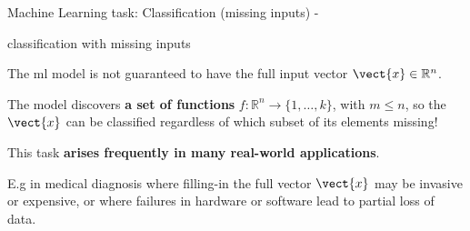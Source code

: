 
\begin{frame}[t,allowframebreaks]{
    Machine Learning task: Classification (missing inputs) - }

    \Gls{classification} with missing inputs
    
    \begin{itemize}
        {
            \item The \gls{ml} model is not guaranteed 
            to have the full input vector $\vect{x} \in \mathbb{R}^n$.\\
            \begin{itemize}
                {\scriptsize
                \item        
                The model discovers {\bf a set of functions} 
                $f: \mathbb{R}^n \rightarrow \{1,\dots,k\}$, 
                with $m \le n$, so the $\vect{x}$ can be classified
                regardless of which subset of its elements missing!\\
                }
            \end{itemize}
            \vspace{0.1cm}
            This task {\bf arises frequently in many real-world applications}.\\
            \begin{itemize}
                {\scriptsize
                    \item
                    E.g in medical diagnosis where filling-in the 
                    full vector $\vect{x}$ may be invasive or expensive, 
                    or where failures in hardware or software 
                    lead to partial loss of data.\\
                }
            \end{itemize}
        }
    \end{itemize}

\end{frame}